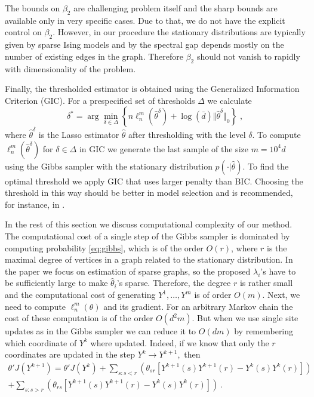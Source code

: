 \documentclass[twoside,11pt]{article}
\def\llnm{\ell_n^m}
\def\th{\theta}
\def\hth{\hat{\theta}}
\begin{document}
The bounds on $\beta_2$ are challenging problem itself and the sharp bounds are available only in very specific cases. Due to that, we do not have the explicit control on $\beta_2$. However, in our procedure
the stationary distributions are typically given by sparse Ising models and by \citet{mossel2013exact} the spectral gap depends mostly on the number of existing edges in the graph. Therefore $\beta_2$ should not vanish to rapidly with dimensionality of the problem.








Finally, the thresholded estimator is obtained using the Generalized Information Criterion (GIC).
For a prespecified set of thresholds $\Delta$ we calculate  
\[
\delta^* =\arg \min_{\delta \in \Delta} \left \{n\llnm (\hat{\th}^\delta)+\log(\bar d)\Vert \hat{\th} ^\delta \Vert_0\right\}\;,
\]
where $\hat{\th}^\delta$ is the Lasso estimator $\hth$ after thresholding with the level $\delta$. To compute $\llnm (\hat{\th} ^\delta)$ for $\delta \in \Delta$ in GIC we generate the last sample of the size $m=10^4 d$ using the Gibbs sampler with the stationary distribution  $p(\cdot|\hat \theta).$ To find the optimal threshold we apply GIC that uses larger penalty than BIC. Choosing the threshold in this way should be better in model selection and is recommended, for instance, in \citet{pokmiel:15}.






In the rest of this section we discuss computational complexity of our method.
The computational cost of a single step of the Gibbs sampler is dominated by computing probability \eqref{eq:gibbs}, which is of the order $O(r)$, where $r$ is the maximal degree of vertices in a graph related to the stationary distribution. 
In the paper we focus on estimation of sparse graphs, so the proposed $\lambda _i$'s have to be sufficiently large to make $\hth _i$'s sparse. Therefore, the degree $r$ is rather small and the computational cost of generating
$Y^1,\dots,Y^m$ is of order $O(m)$. Next, we need to compute $\ell^m_n(\th)$ and its gradient. For an arbitrary Markov chain the cost of these computation is of the order $O(d^2m)$. But when we use single site updates as in the Gibbs sampler
we can reduce it to $O(dm)$ by remembering which coordinate of $Y^k$ where updated. Indeed, if we know that only the $r$ coordinates  are updated in the step $Y^k\to Y^{k+1},$ then
\begin{multline*}
\th ' J(Y^{k+1})=\th' J(Y^k)+ \sum_{s\colon s<r} \left(\th_{sr}[Y^{k+1}(s)Y^{k+1}(r)- Y^{k}(s)Y^{k}(r)]\right)
\\+\sum_{s\colon s>r} \left(\th_{rs}[Y^{k+1}(s)Y^{k+1}(r)- Y^{k}(s)Y^{k}(r)]\right)\,.
\end{multline*}
\end{document}
